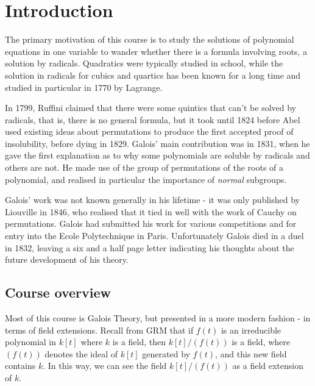 \documentclass{article}
\begin{document}
\maketitle

\tableofcontents


\clearpage
\section{Introduction}
The primary motivation of this course is to study the solutions of polynomial equations in one variable to wander whether there is a formula involving roots, a solution by radicals.
Quadratics were typically studied in school, while the solution in radicals for cubics and quartics has been known for a long time and studied in particular in 1770 by Lagrange.

In 1799, Ruffini claimed that there were some quintics that can't be solved by radicals, that is, there is no general formula, but it took until 1824 before Abel used existing ideas about permutations to produce the first accepted proof of insolubility, before dying in 1829.
Galois' main contribution was in 1831, when he gave the first explanation as to why some polynomials are soluble by radicals and others are not.
He made use of the group of permutations of the roots of a polynomial, and realised in particular the importance of \emph{normal} subgroups.

Galois' work was not known generally in his lifetime - it was only published by Liouville in 1846, who realised that it tied in well with the work of Cauchy on permutations.
Galois had submitted his work for various competitions and for entry into the Ecole Polytechnique in Paris.
Unfortunately Galois died in a duel in 1832, leaving a six and a half page letter indicating his thoughts about the future development of his theory.

\subsection{Course overview}
Most of this course is Galois Theory, but presented in a more modern fashion - in terms of field extensions.
Recall from GRM that if $f(t)$ is an irreducible polynomial in $k[t]$ where $k$ is a field, then $k[t]/(f(t))$ is a field, where $(f(t))$ denotes the ideal of $k[t]$ generated by $f(t)$, and this new field contains $k$.
In this way, we can see the field $k[t]/(f(t))$ as a field extension of $k$.
\end{document}
